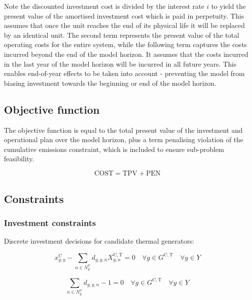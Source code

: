\documentclass{article}
\newcommand{\sGeneratorsCandidateThermal}{G^{\mathrm{C,T}}}
\newcommand{\sYears}{Y}
\newcommand{\sInvestmentSizeOptions}{N^{\mathrm{C}}}
\newcommand{\sInvestmentSizeOptionsGenerator}[1][\iGenerator]{\sInvestmentSizeOptions_{#1}}
\newcommand{\iGenerator}{g}
\newcommand{\iYear}{y}
\newcommand{\iInvestmentSizeOption}{n}
\newcommand{\cInterestRate}{i}
\newcommand{\cTotalPresentValue}[1][]{\mathrm{TPV}_{#1}}
\newcommand{\cInvestmentSize}{X^{\mathrm{C,T}}_{\iGenerator,\iInvestmentSizeOption}}
\newcommand{\cEmissionsViolationTotalCost}{\mathrm{PEN}}
\newcommand{\cObjectiveFunction}{\mathrm{COST}}
\newcommand{\vInstalledCapacity}[1][\iGenerator,\iYear]{x^{\mathrm{C}}_{#1}}
\newcommand{\vInvestmentSizeIndicator}[1][\iGenerator,\iYear,\iInvestmentSizeOption]{d_{#1}}
\begin{document}
Note the discounted investment cost is divided by the interest rate $\cInterestRate$ to yield the present value of the amortised investment cost which is paid in perpetuity. This assumes that once the unit reaches the end of its physical life it will be replaced by an identical unit. The second term represents the present value of the total operating costs for the entire system, while the following term captures the costs incurred beyond the end of the model horizon. It assumes that the costs incurred in the last year of the model horizon will be incurred in all future years. This enables end-of-year effects to be taken into account - preventing the model from biasing investment towards the beginning or end of the model horizon.

\subsection{Objective function}
The objective function is equal to the total present value of the investment and operational plan over the model horizon, plus a term penalising violation of the cumulative emissions constraint, which is included to ensure sub-problem feasibility.

\begin{equation}
\cObjectiveFunction = \cTotalPresentValue + \cEmissionsViolationTotalCost
\end{equation}


\subsection{Constraints}
\subsubsection{Investment constraints}

Discrete investment decisions for candidate thermal generators:

\begin{equation}
\vInstalledCapacity - \sum\limits_{\iInvestmentSizeOption \in \sInvestmentSizeOptionsGenerator} \vInvestmentSizeIndicator \cInvestmentSize = 0 \quad \forall \iGenerator \in \sGeneratorsCandidateThermal \quad \forall \iYear \in \sYears 
\label{eqn: candidate thermal unit capacity}
\end{equation}

\begin{equation}
\sum\limits_{\iInvestmentSizeOption \in \sInvestmentSizeOptionsGenerator} \vInvestmentSizeIndicator - 1 = 0 \quad \forall \iGenerator \in \sGeneratorsCandidateThermal \quad \forall \iYear \in \sYears
\label{eqn: capacity thermal unit discrete size option - single choice}
\end{equation}
\end{document}
